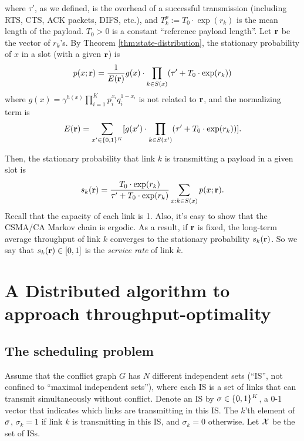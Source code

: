 \documentclass{IEEEtran}
\begin{document}
where $\tau'$, as we defined, is the overhead of a successful transmission
(including RTS, CTS, ACK packets, DIFS, etc.), and $T_{k}^{p}:=T_{0}\cdot\exp(r_{k})$
is the mean length of the payload. $T_{0}>0$ is a constant {}``reference
payload length''. Let ${\bf r}$ be the vector of $r_{k}$'s. By
Theorem \ref{thm:state-distribution}, the stationary probability
of $x$ in a slot (with a given ${\bf r}$) is \begin{equation}
p(x;{\bf r})=\frac{1}{E({\bf r})}g(x)\cdot\prod_{k\in S(x)}(\tau'+T_{0}\cdot\exp(r_{k}))\label{eq:px_given_r}\end{equation}
where $g(x)=\gamma^{h(x)}\prod_{i=1}^{K}p_{i}^{x_{i}}q_{i}^{1-x_{i}}$
is not related to ${\bf r}$, and the normalizing term is \begin{equation}
E({\bf r})=\sum_{x'\in\{0,1\}^{K}}[g(x')\cdot\prod_{k\in S(x')}(\tau'+T_{0}\cdot\exp(r_{k}))].\label{eq:E_r}\end{equation}


Then, the stationary probability that link $k$ is transmitting a
payload in a given slot is\begin{equation}
s_{k}({\bf r})=\frac{T_{0}\cdot\exp(r_{k})}{\tau'+T_{0}\cdot\exp(r_{k})}\sum_{x:k\in S(x)}p(x;{\bf r}).\label{eq:throughput}\end{equation}
Recall that the capacity of each link is 1. Also, it's easy to show
that the CSMA/CA Markov chain is ergodic. As a result, if ${\bf r}$
is fixed, the long-term average throughput of link $k$ converges
to the stationary probability $s_{k}({\bf r})$. So we say that $s_{k}({\bf r})\in[0,1]$
is the \emph{service rate} of link $k$.


\section{\label{sec:algorithms}A Distributed algorithm to approach throughput-optimality}


\subsection{The scheduling problem}

Assume that the conflict graph $G$ has $N$ different independent
sets ({}``IS'', not confined to {}``maximal independent sets''),
where each IS is a set of links that can transmit simultaneously without
conflict. Denote an IS by ${\bf \sigma}\in\{0,1\}^{K}$, a 0-1 vector that
indicates which links are transmitting in this IS. The $k$'th element
of ${\bf \sigma}$, $\sigma_{k}=1$ if link $k$ is transmitting in this
IS, and $\sigma_{k}=0$ otherwise. Let ${\cal X}$ be the set of ISs. 
\end{document}
